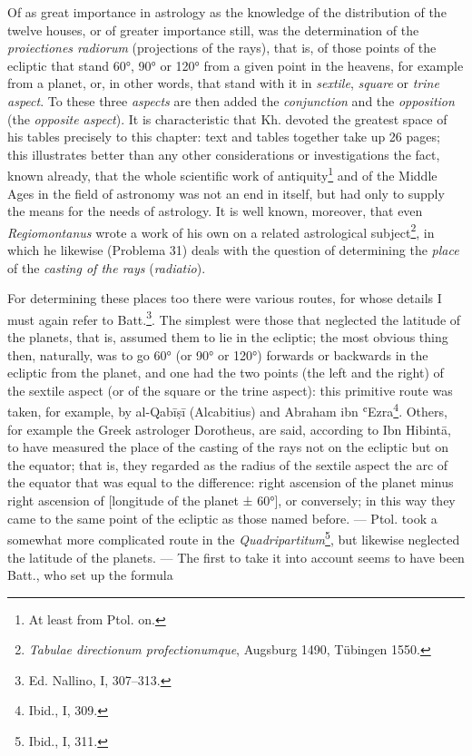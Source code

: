 \documentclass[11pt]{article}
\newcommand{\Pg}[1]{\marginpar{\footnotesize\color{gray}#1}}
\begin{document}
\par \Pg{99}Of as great importance in astrology as the knowledge of the distribution of the twelve houses, or of greater importance still, was the determination of the \emph{proiectiones radiorum} (projections of the rays), that is, of those points of the ecliptic that stand 60°, 90° or 120° from a given point in the heavens, for example from a planet, or, in other words, that stand with it in \emph{sextile}, \emph{square} or \emph{trine aspect}. To these three \emph{aspects} are then added the \emph{conjunction} and the \emph{opposition} (the \emph{opposite aspect}). It is characteristic that Kh. devoted the greatest space of his tables precisely to this chapter: text and tables together take up 26 pages; this illustrates better than any other considerations or investigations the fact, known already, that the whole scientific work of antiquity\footnote{At least from Ptol. on.} and of the Middle Ages in the field of astronomy was not an end in itself, but had only to supply the means for the needs of astrology. It is well known, moreover, that even \emph{Regiomontanus} wrote a work of his own on a related astrological subject\footnote{\emph{Tabulae directionum profectionumque}, Augsburg 1490, Tübingen 1550.}, in which he likewise (Problema 31) deals with the question of determining the \emph{place} of the \emph{casting of the rays} (\emph{radiatio}).\par
\par For determining these places too there were various routes, for whose details I must again refer to Batt.\footnote{Ed. Nallino, I, 307–313.}. The simplest were those that neglected the latitude of the planets, that is, assumed them to lie in the ecliptic; the most obvious thing then, naturally, was to go 60° (or 90° or 120°) forwards or backwards in the ecliptic from the planet, and one had the two points (the left and the right) of the sextile aspect (or of the square or the trine aspect): this primitive route was taken, for example, by al-Qabīṣī (Alcabitius) and Abraham ibn ʿEzra\footnote{Ibid., I, 309.}. Others, for example the Greek astrologer Dorotheus, are said, according to Ibn Hibintā, to have measured the place of the casting of the rays not on the ecliptic but on the equator; that is, they regarded as the radius of the sextile aspect the arc of the equator that was equal to the difference: right ascension of the planet minus right ascension of [longitude of the planet ± 60°], or conversely; in this way they came to the same point of the ecliptic as those named before. — Ptol. took a somewhat more complicated route in the \emph{Quadripartitum}\footnote{Ibid., I, 311.}, but likewise neglected the latitude of the planets. — The first to take it into account seems to have been Batt., who set up the formula\par
\end{document}
